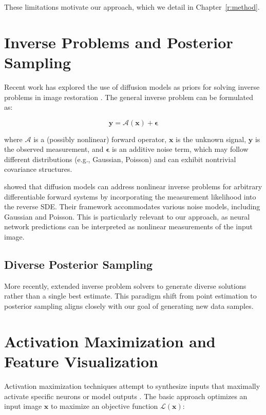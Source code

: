 \documentclass[licencjacka,en]{pracamgr}
\begin{document}
These limitations motivate our approach, which we detail in Chapter~\ref{r:method}.

\section{Inverse Problems and Posterior Sampling}

Recent work has explored the use of diffusion models as priors for solving inverse problems in image restoration \cite{song2023pseudoinverse, chung2024diffusionposteriorsamplinggeneral}. The general inverse problem can be formulated as:

\begin{equation}
\mathbf{y} = \mathcal{A}(\mathbf{x}) + \boldsymbol{\epsilon}
\label{eq:inverse_problem}
\end{equation}

where $\mathcal{A}$ is a (possibly nonlinear) forward operator, $\mathbf{x}$ is the unknown signal, $\mathbf{y}$ is the observed measurement, and $\boldsymbol{\epsilon}$ is an additive noise term, which may follow different distributions (e.g., Gaussian, Poisson) and can exhibit nontrivial covariance structures.

\cite{chung2024diffusionposteriorsamplinggeneral} showed that diffusion models can address nonlinear inverse problems for arbitrary differentiable forward systems by incorporating the measurement likelihood into the reverse SDE. Their framework accommodates various noise models, including Gaussian and Poisson. This is particularly relevant to our approach, as neural network predictions can be interpreted as nonlinear measurements of the input image.

\subsection{Diverse Posterior Sampling}

More recently, \cite{cohen2024posteriorsamplingmeaningfuldiversity} extended inverse problem solvers to generate diverse solutions rather than a single best estimate. This paradigm shift from point estimation to posterior sampling aligns closely with our goal of generating new data samples.

\section{Activation Maximization and Feature Visualization}

Activation maximization techniques attempt to synthesize inputs that maximally activate specific neurons or model outputs \cite{erhan2009visualizing, mordvintsev2015deepdream}. The basic approach optimizes an input image $\mathbf{x}$ to maximize an objective function $\mathcal{L}(\mathbf{x})$:
\end{document}
